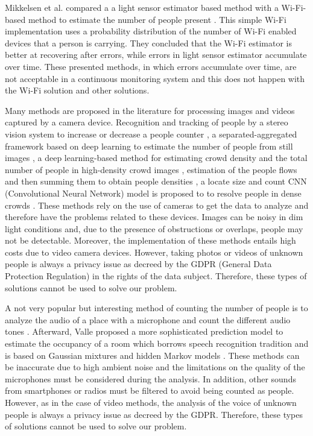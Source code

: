 Mikkelsen et al. compared a a light sensor estimator based method with a Wi-Fi-based method to estimate the number of people present \cite{mikkelsen2018sensing}. This simple Wi-Fi implementation uses a probability distribution of the number of Wi-Fi enabled devices that a person is carrying. They concluded that the Wi-Fi estimator is better at recovering after errors, while errors in light sensor estimator accumulate over time.
These presented methods, in which errors accumulate over time, are not acceptable in a continuous monitoring system and this does not happen with the Wi-Fi solution and other solutions.

Many methods are proposed in the literature for processing images and videos captured by a camera device. Recognition and tracking of people by a stereo vision system to increase or decrease a people counter \cite{bernini2014embedded}, a separated-aggregated framework based on deep learning to estimate the number of people from still images \cite{zhang2018auxiliary}, a deep learning-based method for estimating crowd density and the total number of people in high-density crowd images \cite{zhang2019deep}, estimation of the people flows and then summing them to obtain people densities \cite{liu2019estimating}, a locate size and count CNN (Convolutional Neural Network) model is proposed to to resolve people in dense crowds \cite{sam2019locate}.
These methods rely on the use of cameras to get the data to analyze and therefore have the problems related to these devices. Images can be noisy in dim light conditions and, due to the presence of obstructions or overlaps, people may not be detectable. Moreover, the implementation of these methods entails high costs due to video camera devices. However, taking photos or videos of unknown people is always a privacy issue as decreed by the GDPR (General Data Protection Regulation) in the rights of the data subject. Therefore, these types of solutions cannot be used to solve our problem.

A not very popular but interesting method of counting the number of people is to analyze the audio of a place with a microphone and count the different audio tones \cite{kannan2012low}. Afterward, Valle proposed a more sophisticated prediction model to estimate the occupancy of a room which borrows speech recognition tradition and is based on Gaussian mixtures and hidden Markov models \cite{valle2016abroa}.
These methods can be inaccurate due to high ambient noise and the limitations on the quality of the microphones must be considered during the analysis. In addition, other sounds from smartphones or radios must be filtered to avoid being counted as people. However, as in the case of video methods, the analysis of the voice of unknown people is always a privacy issue as decreed by the GDPR. Therefore, these types of solutions cannot be used to solve our problem.

